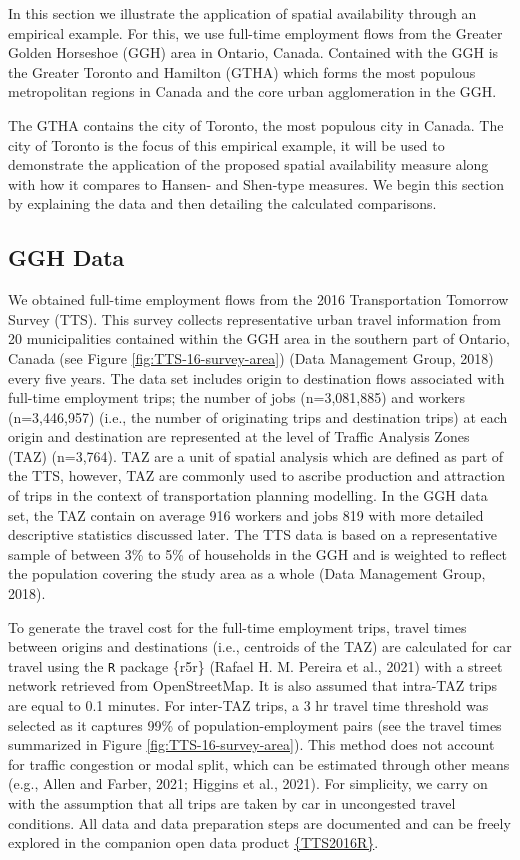 \documentclass[]{elsarticle} %
\begin{document}
In this section we illustrate the application of spatial availability
through an empirical example. For this, we use full-time employment
flows from the Greater Golden Horseshoe (GGH) area in Ontario, Canada.
Contained with the GGH is the Greater Toronto and Hamilton (GTHA) which
forms the most populous metropolitan regions in Canada and the core
urban agglomeration in the GGH.

The GTHA contains the city of Toronto, the most populous city in Canada.
The city of Toronto is the focus of this empirical example, it will be
used to demonstrate the application of the proposed spatial availability
measure along with how it compares to Hansen- and Shen-type measures. We
begin this section by explaining the data and then detailing the
calculated comparisons.

\hypertarget{ggh-data}{%
\subsection{GGH Data}\label{ggh-data}}

We obtained full-time employment flows from the 2016 Transportation
Tomorrow Survey (TTS). This survey collects representative urban travel
information from 20 municipalities contained within the GGH area in the
southern part of Ontario, Canada (see Figure
\ref{fig:TTS-16-survey-area}) (Data Management Group, 2018) every five
years. The data set includes origin to destination flows associated with
full-time employment trips; the number of jobs (n=3,081,885) and workers
(n=3,446,957) (i.e., the number of originating trips and destination
trips) at each origin and destination are represented at the level of
Traffic Analysis Zones (TAZ) (n=3,764). TAZ are a unit of spatial
analysis which are defined as part of the TTS, however, TAZ are commonly
used to ascribe production and attraction of trips in the context of
transportation planning modelling. In the GGH data set, the TAZ contain
on average 916 workers and jobs 819 with more detailed descriptive
statistics discussed later. The TTS data is based on a representative
sample of between 3\% to 5\% of households in the GGH and is weighted to
reflect the population covering the study area as a whole (Data
Management Group, 2018).

To generate the travel cost for the full-time employment trips, travel
times between origins and destinations (i.e., centroids of the TAZ) are
calculated for car travel using the \texttt{R} package \{r5r\} (Rafael
H. M. Pereira et al., 2021) with a street network retrieved from
OpenStreetMap. It is also assumed that intra-TAZ trips are equal to 0.1
minutes. For inter-TAZ trips, a 3 hr travel time threshold was selected
as it captures 99\% of population-employment pairs (see the travel times
summarized in Figure \ref{fig:TTS-16-survey-area}). This method does not
account for traffic congestion or modal split, which can be estimated
through other means (e.g., Allen and Farber, 2021; Higgins et al.,
2021). For simplicity, we carry on with the assumption that all trips
are taken by car in uncongested travel conditions. All data and data
preparation steps are documented and can be freely explored in the
companion open data product
\href{https://soukhova.github.io/TTS2016R/}{\{TTS2016R\}}.
\end{document}
